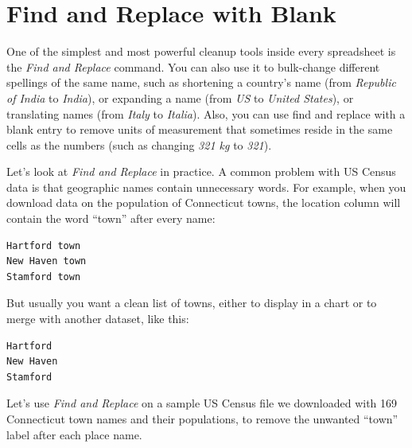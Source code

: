 \documentclass[
  english,
]{book}
\begin{document}
\hypertarget{find-and-replace}{%
\section*{Find and Replace with Blank}\label{find-and-replace}}

One of the simplest and most powerful cleanup tools inside every spreadsheet is the \emph{Find and Replace} command. You can also use it to bulk-change different spellings of the same name, such as shortening a country's name (from \emph{Republic of India} to \emph{India}), or expanding a name (from \emph{US} to \emph{United States}), or translating names (from \emph{Italy} to \emph{Italia}). Also, you can use find and replace with a blank entry to remove units of measurement that sometimes reside in the same cells as the numbers (such as changing \emph{321 kg} to \emph{321}).

Let's look at \emph{Find and Replace} in practice. A common problem with US Census data is that geographic names contain unnecessary words. For example, when you download data on the population of Connecticut towns, the location column will contain the word ``town'' after every name:

\begin{verbatim}
Hartford town
New Haven town
Stamford town
\end{verbatim}

But usually you want a clean list of towns, either to display in a chart or to merge with another dataset, like this:

\begin{verbatim}
Hartford
New Haven
Stamford
\end{verbatim}

Let's use \emph{Find and Replace} on a sample US Census file we downloaded with 169 Connecticut town names and their populations, to remove the unwanted ``town'' label after each place name.
\end{document}
